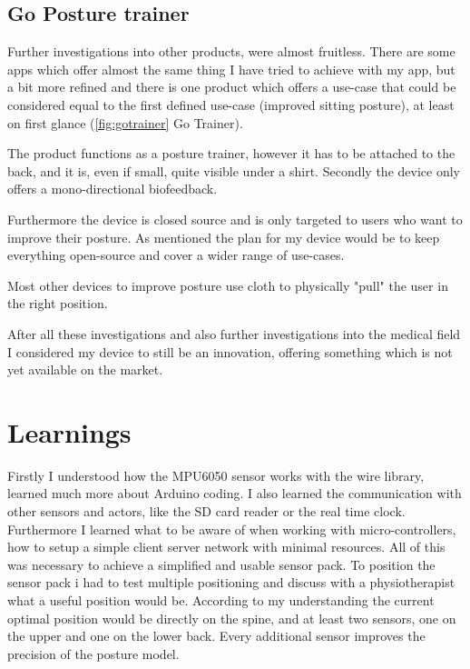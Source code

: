 \subsection{Go Posture trainer}

Further investigations into other products, were almost fruitless. There are some apps which offer almost the same thing I have tried to achieve with my app, but a bit more refined and there is one product which offers a use-case that could be considered equal to the first defined use-case (improved sitting posture), at least on first glance (\ref{fig:gotrainer} Go Trainer). 

The product functions as a posture trainer, however it has to be attached to the back, and it is, even if small, quite visible under a shirt. Secondly the device only offers a mono-directional biofeedback. \cite{HowToImp2:online}

Furthermore the device is closed source and is only targeted to users who want to improve their posture. As mentioned the plan for my device would be to keep everything open-source and cover a wider range of use-cases. 

Most other devices to improve posture use cloth to physically "pull" the user in the right position.

After all these investigations and also further investigations into the medical field I considered my device to still be an innovation, offering something which is not yet available on the market.


\section{Learnings}

Firstly I understood how the MPU6050 sensor works with the wire library, learned much more about Arduino coding. I also learned the communication with other sensors and actors, like the SD card reader or the real time clock. Furthermore I learned what to be aware of when working with micro-controllers, how to setup a simple client server network with minimal resources. All of this was necessary to achieve a simplified and usable sensor pack. 
To position the sensor pack i had to test multiple positioning and discuss with a physiotherapist what a useful position would be. According to my understanding the current optimal position would be directly on the spine, and at least two sensors, one on the upper and one on the lower back. Every additional sensor improves the precision of the posture model. 


